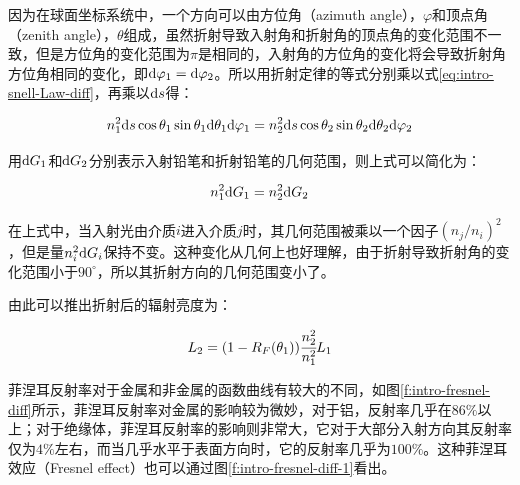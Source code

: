 \noindent 因为在球面坐标系统中，一个方向可以由方位角（azimuth angle），$\varphi$和顶点角（zenith angle），$\theta$组成，虽然折射导致入射角和折射角的顶点角的变化范围不一致，但是方位角的变化范围为$\pi$是相同的，入射角的方位角的变化将会导致折射角方位角相同的变化，即${\rm d}\varphi_1={\rm d}\varphi_2$。所以用折射定律的等式分别乘以式\ref{eq:intro-snell-Law-diff}，再乘以${\rm d}s$得：

\begin{equation}
	n^{2}_1{\rm d}s\cos\theta_1 \sin\theta_1 {\rm d}\theta_1 {\rm d}\varphi_1=n^{2}_2 {\rm d}s \cos\theta_2 \sin\theta_2 {\rm d}\theta_2 {\rm d}\varphi_2
\end{equation}

\noindent 用${\rm d}G_1$和${\rm d}G_2$分别表示入射铅笔和折射铅笔的几何范围，则上式可以简化为：

\begin{equation}\label{eq:eq-intro-eq:intro-snell-Law-1}
	n^{2}_1 {\rm d}G_1=n^{2}_2 {\rm d}G_2
\end{equation}

在上式中，当入射光由介质$i$进入介质$j$时，其几何范围被乘以一个因子$(n_j/n_i)^2$，但是量$n^2_i{\rm d}G_i$保持不变。这种变化从几何上也好理解，由于折射导致折射角的变化范围小于$90^{\circ}$，所以其折射方向的几何范围变小了。

由此可以推出折射后的辐射亮度为：

\begin{equation}\label{eq:intro-fresnel-refractiom}
	L_2=(1-R_F(\theta_1)) \cfrac{n^2_2}{n^2_1}L_1
\end{equation}

\noindent 菲涅耳反射率对于金属和非金属的函数曲线有较大的不同，如图\ref{f:intro-fresnel-diff}所示，菲涅耳反射率对金属的影响较为微妙，对于铝，反射率几乎在$86\%$以上；对于绝缘体，菲涅耳反射率的影响则非常大，它对于大部分入射方向其反射率仅为$4\%$左右，而当几乎水平于表面方向时，它的反射率几乎为$100\%$。这种菲涅耳效应（Fresnel effect）也可以通过图\ref{f:intro-fresnel-diff-1}看出。

